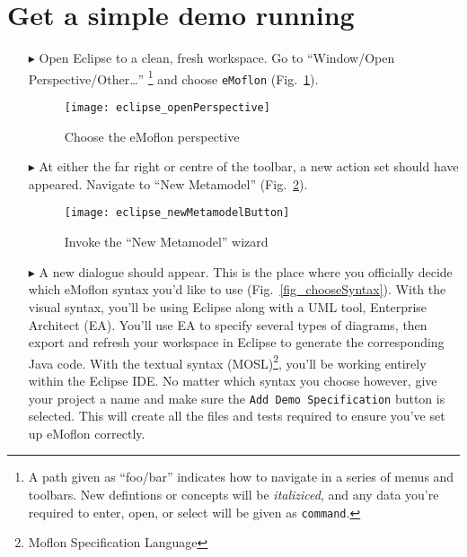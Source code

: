\newpage
\genHeader

\section{Get a simple demo running}


\begin{itemize}
\hypertarget{simpleDemo common}{} 
\item[$\blacktriangleright$] Open Eclipse to a clean, fresh workspace. Go to ``Window/Open Perspective/Other\ldots'' \footnote{A path given as ``foo/bar''
indicates how to navigate in a series of menus and toolbars. New defintions or concepts will be \emph{italiziced}, and any data you're required to enter, open,
or select will be given as \texttt{command}.} and choose \texttt{eMoflon} (Fig.~\ref{fig_eclipse}).

\begin{figure}[htbp]
	\centering
  \texttt{[image: eclipse\_openPerspective]}
	\caption{Choose the eMoflon perspective}
	\label{fig_eclipse}
\end{figure} 

\item[$\blacktriangleright$] At either the far right or centre of the toolbar, a new action set should have appeared. Navigate to ``New Metamodel''
(Fig.~\ref{fig_eclipseNewMetamodelButton}).

\vspace{0.5cm}
\begin{figure}[htbp]
	\centering
  \texttt{[image: eclipse\_newMetamodelButton]}
	\caption{Invoke the ``New Metamodel'' wizard}
	\label{fig_eclipseNewMetamodelButton}
\end{figure}

\newpage

\item[$\blacktriangleright$] A new dialogue should appear. This is the place where you officially decide which eMoflon syntax you'd like to use
(Fig.~\ref{fig_chooseSyntax}). With the visual syntax, you'll be using Eclipse along with a UML tool, Enterprise Architect (EA). You'll use EA to specify
several types of diagrams, then export and refresh your workspace in Eclipse to generate the corresponding Java code. With the textual syntax
(MOSL)\footnote{Moflon Specification Language}, you'll be working entirely within the Eclipse IDE. No matter which syntax you choose however, give your project
a name and make sure the \texttt{Add Demo Specification} button is selected. This will create all the files and tests required to ensure you've set up eMoflon
correctly.


\end{itemize}
